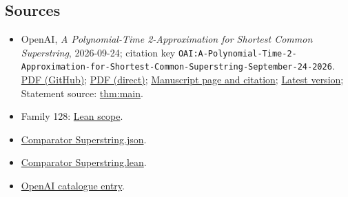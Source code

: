 \documentclass[11pt]{article}
\begin{document}
\subsection{Sources}
\begin{itemize}
\item OpenAI, \emph{A Polynomial-Time 2-Approximation for Shortest Common Superstring}, 2026-09-24; citation key \texttt{OAI:A-Polynomial-Time-2-Approximation-for-Shortest-Common-Superstring-September-24-2026}. \href{https://github.com/openai/math/blob/adc7f1241b42e322a6451854ab7e4b4c146bf78a/preprints/A-Polynomial-Time-2-Approximation-for-Shortest-Common-Superstring-September-24-2026/paper.pdf}{PDF (GitHub)}; \href{https://github.com/openai/math/raw/adc7f1241b42e322a6451854ab7e4b4c146bf78a/preprints/A-Polynomial-Time-2-Approximation-for-Shortest-Common-Superstring-September-24-2026/paper.pdf}{PDF (direct)}; \href{https://github.com/openai/math/blob/adc7f1241b42e322a6451854ab7e4b4c146bf78a/preprints/A-Polynomial-Time-2-Approximation-for-Shortest-Common-Superstring-September-24-2026/README.md}{Manuscript page and citation}; \href{https://github.com/openai/math/blob/main/preprints/A-Polynomial-Time-2-Approximation-for-Shortest-Common-Superstring-September-24-2026/paper.pdf}{Latest version}; Statement source: \href{https://github.com/openai/math/blob/adc7f1241b42e322a6451854ab7e4b4c146bf78a/preprints/A-Polynomial-Time-2-Approximation-for-Shortest-Common-Superstring-September-24-2026/build/sections/01-introduction.tex\#L5}{thm:main}.
\item Family 128: \href{https://github.com/openai/math/blob/adc7f1241b42e322a6451854ab7e4b4c146bf78a/lean/docs/128.md}{Lean scope}.
\item \href{https://github.com/openai/math/blob/adc7f1241b42e322a6451854ab7e4b4c146bf78a/lean/ComparatorChallenges/Superstring.json}{Comparator Superstring.json}.
\item \href{https://github.com/openai/math/blob/adc7f1241b42e322a6451854ab7e4b4c146bf78a/lean/ComparatorChallenges/Superstring.lean}{Comparator Superstring.lean}.
\item \href{https://github.com/openai/math/blob/adc7f1241b42e322a6451854ab7e4b4c146bf78a/CONTENTS.md}{OpenAI catalogue entry}.
\end{itemize}
\end{document}
